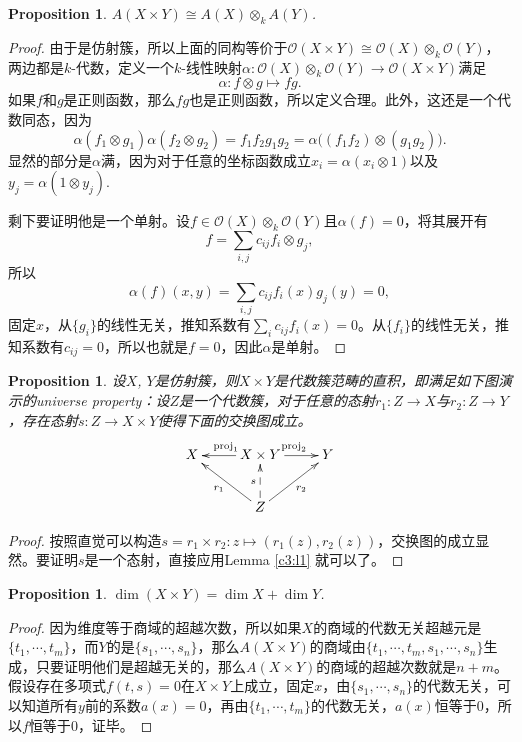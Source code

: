 \documentclass[9pt]{extarticle}
\theoremstyle{plain}%
\newtheorem{pro}[defi]{Proposition}%
\begin{document}
\begin{pro}
	$A(X\times Y)\cong A(X)\otimes_k A(Y)$.
\end{pro}
\begin{proof}
由于是仿射簇，所以上面的同构等价于$\mathcal{O}(X\times Y)\cong \mathcal{O}(X)\otimes_k \mathcal{O}(Y)$，两边都是$k$-代数，定义一个$k$-线性映射$\alpha : \mathcal{O}(X)\otimes_k \mathcal{O}(Y)\to \mathcal{O}(X\times Y)$满足
\[
	\alpha:f\otimes g \mapsto fg.
\]
如果$f$和$g$是正则函数，那么$fg$也是正则函数，所以定义合理。此外，这还是一个代数同态，因为
\[
	\alpha(f_1\otimes g_1)\alpha(f_2\otimes g_2)=f_1f_2g_1g_2=\alpha\bigl((f_1f_2)\otimes (g_1g_2)\bigr).
\]
显然的部分是$\alpha$满，因为对于任意的坐标函数成立$x_i=\alpha(x_i\otimes 1)$以及$y_j=\alpha(1\otimes y_j)$.

剩下要证明他是一个单射。设$f\in \mathcal{O}(X)\otimes_k \mathcal{O}(Y)$且$\alpha(f)=0$，将其展开有
\[
	f=\sum_{i,j}c_{ij}f_i\otimes g_j,
\]
所以
\[
	\alpha(f)(x,y)=\sum_{i,j}c_{ij}f_i(x)g_j(y)=0,
\]
固定$x$，从$\{g_i\}$的线性无关，推知系数有$\sum_{i}c_{ij}f_i(x)=0$。从$\{f_i\}$的线性无关，推知系数有$c_{ij}=0$，所以也就是$f=0$，因此$\alpha$是单射。
\end{proof}
\begin{pro}
	设$X$, $Y$是仿射簇，则$X\times Y$是代数簇范畴的直积，即满足如下图演示的universe property：设$Z$是一个代数簇，对于任意的态射$r_1:Z\to X$与$r_2:Z\to Y$，存在态射$s:Z\to X\times Y$使得下面的交换图成立。
	\[
		\xymatrix{
			X&\ar[l]_{\mathrm{proj}_1}X\times Y\ar[r]^{\mathrm{proj}_2}&Y \\
			&Z\ar@{-->}[u]^s\ar[ul]^{r_1}\ar[ur]_{r_2}&
			}
	\]
\end{pro}
\begin{proof}
	按照直觉可以构造$s=r_1\times r_2:z\mapsto (r_1(z),r_2(z))$，交换图的成立显然。要证明$s$是一个态射，直接应用Lemma \ref{c3:l1} 就可以了。
\end{proof}
\begin{pro}
	$\dim (X\times Y)=\dim X+\dim Y$.
\end{pro}
\begin{proof}
	因为维度等于商域的超越次数，所以如果$X$的商域的代数无关超越元是$\{t_1,\cdots,t_m\}$，而$Y$的是$\{s_1,\cdots,s_n\}$，那么$A(X\times Y)$的商域由$\{t_1,\cdots,t_m,s_1,\cdots,s_n\}$生成，只要证明他们是超越无关的，那么$A(X\times Y)$的商域的超越次数就是$n+m$。假设存在多项式$f(t,s)=0$在$X\times Y$上成立，固定$x$，由$\{s_1,\cdots,s_n\}$的代数无关，可以知道所有$y$前的系数$a(x)=0$，再由$\{t_1,\cdots,t_m\}$的代数无关，$a(x)$恒等于$0$，所以$f$恒等于$0$，证毕。
\end{proof}
\end{document}
